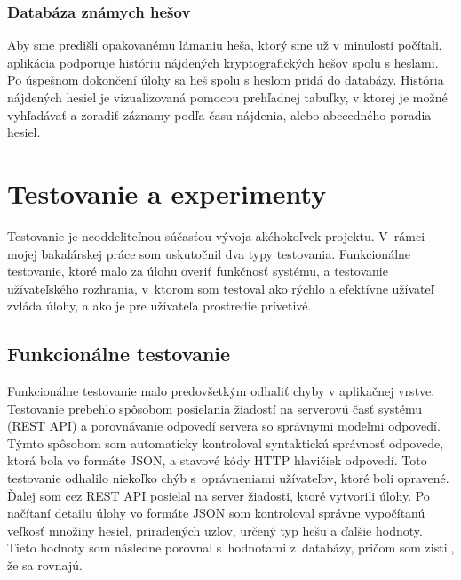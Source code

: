 \documentclass[slovak]{fitthesis}
\begin{document}
\subsection{Databáza známych hešov}
Aby sme predišli opakovanému lámaniu heša, ktorý sme už v minulosti počítali, aplikácia podporuje históriu nájdených kryptografických hešov spolu s heslami. Po úspešnom dokončení úlohy sa heš spolu s heslom pridá do databázy. História nájdených hesiel je vizualizovaná pomocou prehľadnej tabuľky, v ktorej je možné vyhľadávať a zoradiť záznamy podľa času nájdenia, alebo abecedného poradia hesiel.


\chapter{Testovanie a experimenty}\label{testovanie}
Testovanie je neoddeliteľnou súčasťou vývoja akéhokoľvek projektu. V~rámci mojej bakalárskej práce som uskutočnil dva typy testovania. Funkcionálne testovanie, ktoré malo za úlohu overiť funkčnosť systému, a testovanie užívateľského rozhrania, v~ktorom som testoval ako rýchlo a efektívne užívateľ zvláda úlohy, a ako je pre užívateľa  prostredie prívetivé.

\section{Funkcionálne testovanie}
Funkcionálne testovanie malo predovšetkým odhaliť chyby v aplikačnej vrstve. Testovanie prebehlo spôsobom posielania žiadostí na serverovú časť systému (REST API) a porovnávanie odpovedí servera so správnymi modelmi odpovedí. Týmto spôsobom som automaticky kontroloval syntaktickú správnosť odpovede, ktorá bola vo formáte JSON, a stavové kódy HTTP hlavičiek odpovedí. Toto testovanie odhalilo niekoľko chýb s~oprávneniami užívateľov, ktoré boli opravené. Ďalej som cez REST API posielal na server žiadosti, ktoré vytvorili úlohy. Po načítaní detailu úlohy vo formáte JSON som kontroloval správne vypočítanú veľkosť množiny hesiel, priradených uzlov, určený typ hešu a ďalšie hodnoty. Tieto hodnoty som následne porovnal s~hodnotami z~databázy, pričom som zistil, že sa rovnajú.
\end{document}
